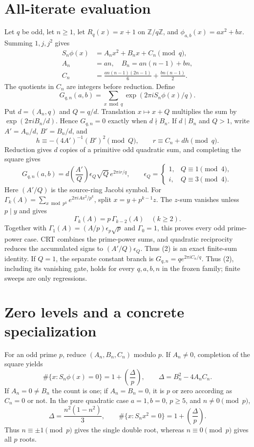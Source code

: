 \documentclass[10pt]{article}
\begin{document}
\section{All-iterate evaluation}
Let $q$ be odd, let $n\ge1$, let $R_q(x)=x+1$ on $\mathbb Z/q\mathbb Z$, and
$\phi_{a,b}(x)=ax^2+bx$.  Summing $1,j,j^2$ gives
\begin{align}
S_n\phi(x)&=A_nx^2+B_nx+C_n\pmod q,\tag{1}\\
A_n&=an,\quad B_n=an(n-1)+bn,\nonumber\\
C_n&=\frac{an(n-1)(2n-1)}6+\frac{bn(n-1)}2.\nonumber
\end{align}
The quotients in $C_n$ are integers before reduction.  Define
\[
G_{q,n}(a,b)=\sum_{x\bmod q}\exp(2\pi iS_n\phi(x)/q).
\]
Put $d=(A_n,q)$ and $Q=q/d$.  Translation $x\mapsto x+Q$ multiplies the
sum by $\exp(2\pi iB_n/d)$.  Hence $G_{q,n}=0$ exactly when $d\nmid B_n$.
If $d\mid B_n$ and $Q>1$, write $A'=A_n/d$, $B'=B_n/d$, and
\[
h\equiv-(4A')^{-1}(B')^2\pmod Q,\qquad r\equiv C_n+dh\pmod q.
\]
Reduction gives $d$ copies of a primitive odd quadratic sum, and completing
the square gives
\[
G_{q,n}(a,b)=d\left(\frac{A'}Q\right)\epsilon_Q\sqrt Q\,
e^{2\pi ir/q},\qquad
\epsilon_Q=\begin{cases}1,&Q\equiv1\pmod4,\\ i,&Q\equiv3\pmod4.
\end{cases}                                                    \tag{2}
\]
Here $(A'/Q)$ is the source-ring Jacobi symbol.  For
$\Gamma_k(A)=\sum_{x\bmod p^k}e^{2\pi iAx^2/p^k}$, split
$x=y+p^{k-1}z$.  The $z$-sum vanishes unless $p\mid y$ and gives
\[
\Gamma_k(A)=p\,\Gamma_{k-2}(A)\quad(k\ge2).
\]
Together with $\Gamma_1(A)=(A/p)\epsilon_p\sqrt p$ and $\Gamma_0=1$, this
proves every odd prime-power case.  CRT combines the prime-power sums, and
quadratic reciprocity reduces the accumulated signs to
$(A'/Q)\epsilon_Q$.  Thus (2) is an exact finite-sum identity.  If $Q=1$,
the separate constant branch is
$G_{q,n}=q e^{2\pi iC_n/q}$.  Thus (2), including its vanishing gate, holds for
every $q,a,b,n$ in the frozen family; finite sweeps are only regressions.

\section{Zero levels and a concrete specialization}
For an odd prime $p$, reduce $(A_n,B_n,C_n)$ modulo $p$.  If $A_n\ne0$,
completion of the square yields
\[
\#\{x:S_n\phi(x)=0\}=1+\left(\frac{\Delta}{p}\right),\qquad
\Delta=B_n^2-4A_nC_n.                                        \tag{3}
\]
If $A_n=0\ne B_n$ the count is one; if $A_n=B_n=0$, it is $p$ or zero
according as $C_n=0$ or not.  In the pure quadratic case $a=1,b=0$, $p\ge5$,
and $n\ne0\pmod p$,
\[
\Delta=\frac{n^2(1-n^2)}3,
\qquad \#\{x:S_nx^2=0\}=1+\left(\frac{\Delta}{p}\right).     \tag{4}
\]
Thus $n\equiv\pm1\pmod p$ gives the single double root, whereas
$n\equiv0\pmod p$ gives all $p$ roots.
\end{document}

